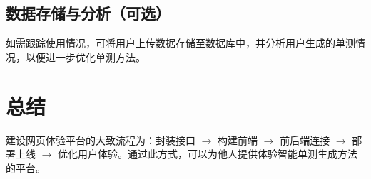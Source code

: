 \section{数据存储与分析（可选）}
如需跟踪使用情况，可将用户上传数据存储至数据库中，并分析用户生成的单测情况，以便进一步优化单测方法。

\chapter{总结}
建设网页体验平台的大致流程为：封装接口 $\rightarrow$ 构建前端 $\rightarrow$ 前后端连接 $\rightarrow$ 部署上线 $\rightarrow$ 优化用户体验。通过此方式，可以为他人提供体验智能单测生成方法的平台。
